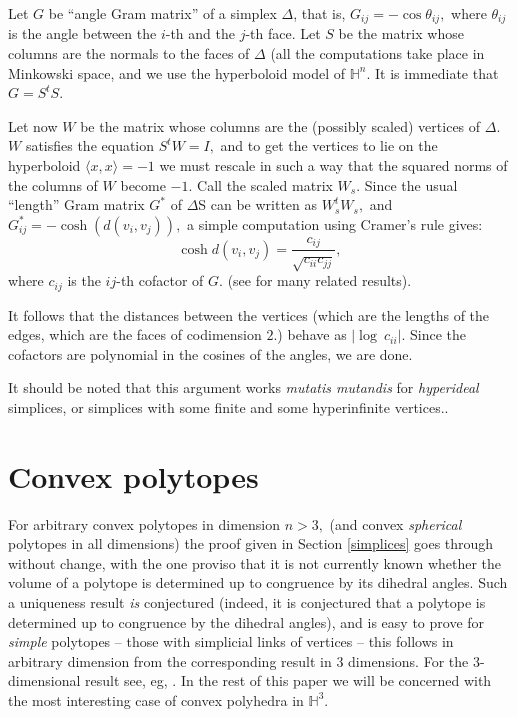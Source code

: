 \documentclass[12pt]{amsart}
\theoremstyle{remark}
\begin{document}
Let $G$ be ``angle Gram matrix'' of a simplex $\Delta$, that is, $G_{ij} = - \cos\theta_{ij},$ where $\theta_{ij}$ is the angle between the $i$-th and the $j$-th face.  Let $S$ be the matrix whose columns are the normals to the faces of $\Delta$ (all the computations take place in Minkowski space, and we use the hyperboloid model of $\mathbb{H}^n.$ It is immediate that $G = S^t S.$

Let now $W$ be the matrix whose columns are the (possibly scaled) vertices of $\Delta.$ $W$ satisfies the equation $S^t W = I,$ and to get the vertices to lie on the hyperboloid $\langle x, x\rangle = -1$ we must rescale in such a way that the squared norms of the columns of $W$ become $-1.$ Call the scaled matrix $W_s.$ Since the usual ``length'' Gram matrix $G^*$ of $\Delta$S can be written as $W_s^tW_s,$ and $G^*_{ij} = - \cosh(d(v_i, v_j)),$ a simple computation using Cramer's rule gives:
\[
\cosh d(v_i, v_j) = \dfrac{c_{ij}}{\sqrt{c_{ii} c_{jj}}},
\]
where $c_{ij}$ is the $ij$-th cofactor of $G.$ (see \cite{muraushi} for many related results).


It  follows that the distances between the vertices (which are the lengths of the edges, which are the faces of codimension $2.$) behave as $|\log\ c_{ii}|.$ Since the cofactors are polynomial in the cosines of the angles, we are done.

It should be noted that this argument works \emph{mutatis mutandis} for \emph{hyperideal} simplices, or simplices with some finite and some hyperinfinite vertices..

\section{Convex polytopes}
\label{convexpoly}
For arbitrary convex polytopes in dimension $n > 3,$ (and convex \emph{spherical} polytopes in all dimensions)  the proof given in Section \ref{simplices} goes through without change, with the one proviso that it is not currently known whether the volume of a polytope is determined up to congruence by its dihedral angles. Such a uniqueness result \emph{is} conjectured (indeed, it is conjectured that a polytope is determined up to congruence by the dihedral angles), and is easy to prove for \emph{simple} polytopes -- those with simplicial links of vertices -- this follows in arbitrary dimension from the corresponding result in $3$ dimensions. For the $3$-dimensional result see, eg, \cite{thes0,thes}.  In the rest of this paper we will be concerned with the most interesting case of convex polyhedra in $\mathbb{H}^3.$
\end{document}

